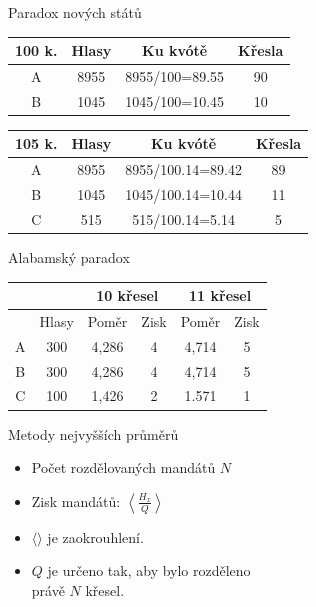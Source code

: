 \documentclass[17pt]{beamer}
\begin{document}
\begin{frame}{Paradox nových států}
\begin{center}
\begin{tabular}{|c|c|c|c|}
\hline 
100 k. & Hlasy & Ku kvótě & Křesla \\ 
\hline 
A & 8955 & \hspace{0.35cm}8955/100=89.55\hspace{0.35cm} & 90 \\ 
\hline 
B & 1045 & 1045/100=10.45 & 10 \\ 
\hline 
\end{tabular}
\end{center} 
\begin{center}
\begin{tabular}{|c|c|c|c|}
\hline 
105 k. & Hlasy & Ku kvótě & Křesla \\ 
\hline 
A & 8955 & 8955/100.14=89.42 & 89 \\ 
\hline 
B & 1045 & 1045/100.14=10.44 & 11 \\ 
\hline 
C & 515 & 515/100.14=5.14 & 5 \\ 
\hline 
\end{tabular} 
\end{center}
\end{frame}

\begin{frame}{Alabamský paradox}
\begin{center}
\begin{tabular}{|c|c|c|c|c|c|}
\hline 
 &  & \multicolumn{2}{c|}{10 křesel} & \multicolumn{2}{c|}{11 křesel} \\ 
\hline 
 & Hlasy & Poměr & Zisk & Poměr & Zisk \\ 
\hline 
A & 300 & 4,286 & 4 & 4,714 & 5 \\ 
\hline 
B & 300 & 4,286 & 4 & 4,714 & 5 \\ 
\hline 
C & 100 & 1,426 & 2 & 1.571 & 1 \\ 
\hline
\end{tabular} 
\end{center}
\end{frame}

\begin{frame}{Metody nejvyšších průměrů}
\begin{itemize}
\item Počet rozdělovaných mandátů $N$
\item Zisk mandátů: $\left\langle\frac{H_{x}}{Q}\right\rangle$
\item $\langle$\hspace{0.15cm}$\rangle$ je zaokrouhlení.
\item $Q$ je určeno tak, aby bylo rozděleno \\ právě $N$ křesel.
\end{itemize}
\end{frame}
\end{document}
